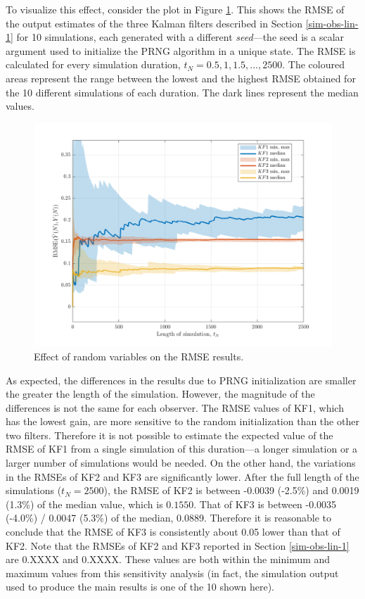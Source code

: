 To visualize this effect, consider the plot in Figure \ref{fig:rod-obs-sim-1-3KF-seed-crmse-statsplot}. This shows the RMSE of the output estimates of the three Kalman filters described in Section \ref{sim-obs-lin-1} for 10 simulations, each generated with a different \textit{seed}—the seed is a scalar argument used to initialize the PRNG algorithm in a unique state. The RMSE is calculated for every simulation duration, $t_N=0.5,1,1.5,...,2500$. The coloured areas represent the range between the lowest and the highest RMSE obtained for the 10 different simulations of each duration. The dark lines represent the median values.

\begin{figure}[htp]
	\centering
	\includegraphics[width=14cm]{images/rod_obs_sim1_3KF_seed_crmse_statsplot.pdf}
	\caption{Effect of random variables on the RMSE results.}
	\label{fig:rod-obs-sim-1-3KF-seed-crmse-statsplot}
\end{figure}

As expected, the differences in the results due to PRNG initialization are smaller the greater the length of the simulation. However, the magnitude of the differences is not the same for each observer. The RMSE values of KF1, which has the lowest gain, are more sensitive to the random initialization than the other two filters. Therefore it is not possible to estimate the expected value of the RMSE of KF1 from a single simulation of this duration---a longer simulation or a larger number of simulations would be needed. On the other hand, the variations in the RMSEs of KF2 and KF3 are significantly lower. After the full length of the simulations ($t_N=2500$), the RMSE of KF2 is between -0.0039 (-2.5\%) and 0.0019 (1.3\%) of the median value, which is $0.1550$.  That of KF3 is between -0.0035 (-4.0\%) / 0.0047 (5.3\%) of the median, 0.0889.  Therefore it is reasonable to conclude that the RMSE of KF3 is consistently about 0.05 lower than that of KF2. Note that the RMSEs of KF2 and KF3 reported in Section \ref{sim-obs-lin-1} are \alert{0.XXXX} and \alert{0.XXXX}. These values are both within the minimum and maximum values from this sensitivity analysis (in fact, the simulation output used to produce the main results is one of the 10 shown here).

